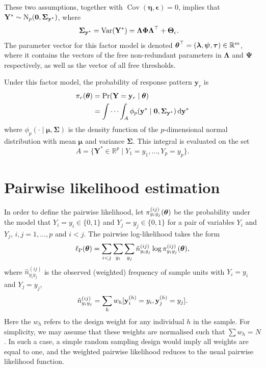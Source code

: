 \documentclass[
]{article}
\begin{document}
These two assumptions, together with
\(\operatorname{Cov}(\boldsymbol\eta, \boldsymbol\epsilon) = 0\),
implies that
\(\mathbf Y^*\sim\operatorname{N}_p(\mathbf 0,{\boldsymbol\Sigma}_{{\mathbf y}^*})\), where
\begin{align}
{\boldsymbol\Sigma}_{{\mathbf y}^*}
= \operatorname{Var}(\mathbf Y^*) 
&= \boldsymbol\Lambda\boldsymbol\Phi\boldsymbol\Lambda^\top + \boldsymbol\Theta_\epsilon.
\end{align} The parameter vector for this factor model is denoted
\(\boldsymbol\theta^\top = (\boldsymbol\lambda, \boldsymbol\psi, \boldsymbol\tau) \in\mathbb{R}^m\),
where it contains the vectors of the free non-redundant parameters in
\(\boldsymbol\Lambda\) and \(\boldsymbol \Psi\) respectively, as well as
the vector of all free thresholds.

Under this factor model, the probability of response pattern
\(\mathbf y_r\) is \begin{align}
\pi_{r}({\boldsymbol\theta})
&= \Pr(\mathbf Y = \mathbf y_r \mid \boldsymbol\theta) \\
&= \idotsint_A \phi_p(\mathbf y^* \mid \mathbf 0, \boldsymbol\Sigma_{\mathbf y^*} ) \, \text{d}\mathbf y^*
\end{align} where
\(\phi_p(\cdot \mid \boldsymbol\mu,\boldsymbol\Sigma)\) is the density
function of the \(p\)-dimensional normal distribution with mean
\(\boldsymbol\mu\) and variance \(\boldsymbol\Sigma\). This integral is
evaluated on the set \[
A = \{ \mathbf Y^* \in \mathbb R^p \mid Y_1=y_1,\dots,Y_p=y_p \}.
\]

\section{Pairwise likelihood
estimation}\label{pairwise-likelihood-estimation}

In order to define the pairwise likelihood, let
\(\pi_{y_iy_j}^{(ij)}({\boldsymbol\theta})\) be the probability under the model that
\(Y_i=y_i \in \{0,1\}\) and \(Y_j=y_j\in\{0,1\}\) for a pair of
variables \(Y_i\) and \(Y_j\), \(i,j=1,\dots,p\) and \(i<j\). The
pairwise log-likelihood takes the form \begin{equation}
\operatorname{\ell_P}({\boldsymbol\theta}) = \sum_{i<j} \sum_{y_i}\sum_{y_j} \hat n_{y_iy_j}^{(ij)} \log \pi_{y_iy_j}^{(ij)}({\boldsymbol\theta}),
\end{equation} where \(\hat n_{y_iy_j}^{(ij)}\) is the observed
(weighted) frequency of sample units with \(Y_i=y_i\) and \(Y_j=y_j\),
\[
\hat n_{y_iy_j}^{(ij)} = \sum_h w_h [{\mathbf y}^{(h)}_i = y_i, {\mathbf y}^{(h)}_j = y_j].
\] Here the \(w_h\) refers to the design weight for any individual \(h\)
in the sample. For simplicity, we may assume that these weights are
normalised such that \(\sum w_h = N\). In such a case, a simple random
sampling design would imply all weights are equal to one, and the
weighted pairwise likelihood reduces to the usual pairwise likelihood
function.
\end{document}
